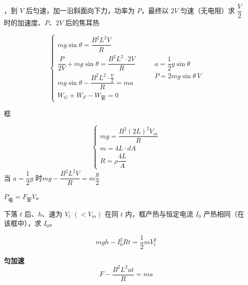 \begin{problem}[④]
，到 $V$ 后匀速，加一沿斜面向下力，功率为 $P$，最终以 $2V$ 匀速（无电阻）\quad 求 $\dfrac{V}{2}$ 时的加速度、$P$、$2V$ 后的焦耳热
\begin{solution}
\[ \left\{\begin{array}{l}
mg\sin\theta=\dfrac{B^2L^2V}{R}\\[2.5ex]
\dfrac{P}{2V}+mg\sin\theta=\dfrac{B^2L^2\cdot 2V}{R}\\[2.5ex]
mg\sin\theta-\dfrac{B^2L^2\cdot\frac{V}{2}}{R}=ma\\[2.5ex]
W_G+W_F-W_{\text{安}}=0
\end{array}\right.\qquad \begin{array}{l}a=\dfrac{1}{2}g\sin\theta\\[2ex] P=2mg\sin\theta\,V\end{array} \] %
\end{solution}
\end{problem}
\begin{problem}[⑤]
框 %
\begin{solution}
\[ \left\{\begin{array}{l}
mg=\dfrac{B^2(2L)^2V_m}{R}\\[2.5ex]
m=4L\cdot dA\\[1ex]
R=\rho\dfrac{4L}{A}
\end{array}\right. \]
\qquad 当 $a=\dfrac{1}{2}g$ 时\quad $mg-\dfrac{B^2L^2V}{R}=m\dfrac{g}{2}$

$P_{\text{电}}=F_{\text{安}}V$。 %
\end{solution}
下落 $t$ 后、$h$、速为 $V_t$ $(<V_m)$ 在同 $t$ 内，框产热与恒定电流 $I_0$ 产热相同（在该框中），求 $I_0$。
\begin{solution}
\[ mgh-I_0^2Rt=\frac{1}{2}mV_t^2 \]
\end{solution}
\end{problem}
\textbf{匀加速}
\[ F-\frac{B^2L^2at}{R}=ma \]
